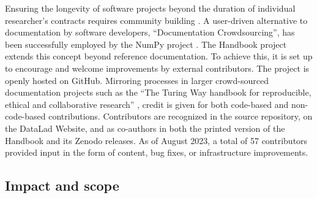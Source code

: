 Ensuring the longevity of software projects beyond the duration of individual researcher's contracts requires community building \citep{koehler2020better}.
A user-driven alternative to documentation by software developers, ``Documentation Crowdsourcing'', has been successfully employed by the NumPy project \citep{pawlik2014crowdsourcing}.
The Handbook project extends this concept beyond reference documentation.
To achieve this, it is set up to encourage and welcome improvements by external contributors.
The project is openly hosted on GitHub.
Mirroring processes in larger crowd-sourced documentation projects such as the ``The Turing Way handbook for reproducible, ethical and collaborative research'' \citep{the_turing_way_community_2022_7625728}, credit is given for both code-based and non-code-based contributions.
Contributors are recognized in the source repository, on the DataLad Website, and as co-authors in both the printed version of the Handbook and its Zenodo releases.
As of August 2023, a total of 57 contributors provided input in the form of content, bug fixes, or infrastructure improvements.


\subsection{Impact and scope}

